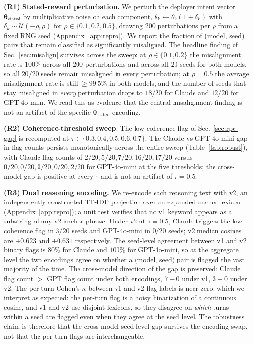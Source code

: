 \documentclass[conference]{IEEEtran}
\begin{document}
\textbf{(R1) Stated-reward perturbation.} We perturb the deployer
intent vector $\boldsymbol{\theta}_{\text{stated}}$ by
multiplicative noise on each component, $\theta_k \leftarrow
\theta_k(1 + \delta_k)$ with $\delta_k \sim \mathcal{U}(-\rho, \rho)$
for $\rho \in \{0.1, 0.2, 0.5\}$, drawing 200 perturbations per
$\rho$ from a fixed RNG seed (Appendix~\ref{app:repro}). We report
the fraction of (model, seed) pairs that remain classified as
significantly misaligned. The headline finding of
Sec.~\ref{sec:misalign} survives across the sweep: at
$\rho \in \{0.1, 0.2\}$ the misalignment rate is $100\%$ across all
$200$ perturbations and across all $20$ seeds for both models, so
all $20/20$ seeds remain misaligned in every perturbation; at
$\rho{=}0.5$ the average misalignment rate is still $\ge 99.5\%$ in
both models, and the number of seeds that stay misaligned in
\emph{every} perturbation drops to $18/20$ for Claude and $12/20$ for
GPT-4o-mini. We read this as evidence that the central misalignment
finding is not an artifact of the specific $\boldsymbol{\theta}_{\text{stated}}$
encoding.

\textbf{(R2) Coherence-threshold sweep.} The low-coherence flag of
Sec.~\ref{sec:rpc-gap} is recomputed at
$\tau \in \{0.3, 0.4, 0.5, 0.6, 0.7\}$. The Claude-vs-GPT-4o-mini gap
in flag counts persists monotonically across the entire sweep
(Table~\ref{tab:robust}), with Claude flag counts of
$2/20, 5/20, 7/20, 16/20, 17/20$ versus
$0/20, 0/20, 0/20, 0/20, 2/20$ for GPT-4o-mini at the five
thresholds; the cross-model gap is positive at every $\tau$ and is
not an artifact of $\tau{=}0.5$.

\textbf{(R3) Dual reasoning encoding.} We re-encode each reasoning
text with v2, an independently constructed TF-IDF projection over an
expanded anchor lexicon (Appendix~\ref{app:repro}); a unit test
verifies that no v1 keyword appears as a substring of any v2 anchor
phrase. Under v2 at $\tau{=}0.5$, Claude triggers the low-coherence
flag in $3/20$ seeds and GPT-4o-mini in $0/20$ seeds; v2 median
cosines are $+0.623$ and $+0.631$ respectively. The seed-level
agreement between v1 and v2 binary flags is $80\%$ for Claude and
$100\%$ for GPT-4o-mini, so at the aggregate level the two
encodings agree on whether a (model, seed) pair is flagged the vast
majority of the time. The cross-model direction of the gap is
preserved: Claude flag count $> $ GPT flag count under both
encodings, $7{-}0$ under v1, $3{-}0$ under v2. The per-turn Cohen's
$\kappa$ between v1 and v2 flag labels is near zero, which we
interpret as expected: the per-turn flag is a noisy binarization of
a continuous cosine, and v1 and v2 use disjoint lexicons, so they
disagree on \emph{which} turns within a seed are flagged even when
they agree at the seed level. The robustness claim is therefore that
the cross-model seed-level gap survives the encoding swap, not that
the per-turn flags are interchangeable.
\end{document}
